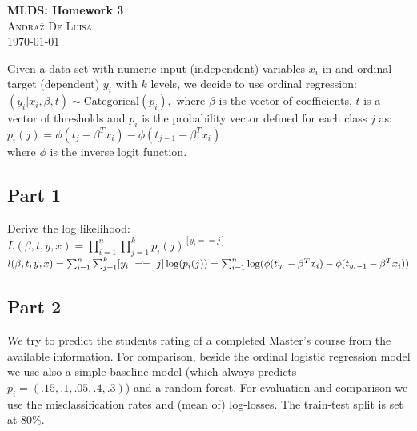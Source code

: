 \documentclass[twocolumn, 8pt]{article}
\begin{document}
\begin{center}

\Large{\textbf{MLDS: Homework 3}} \\
\textsc{\large{Andraž De Luisa}} \\
\vspace{6pt}
\small{\today}

\end{center}

Given a data set with numeric input (independent) variables $x_i$  in and ordinal target (dependent) $y_i$ with $k$ levels, we decide to use ordinal regression: $(y_i|x_i,\beta, t) \sim \text{Categorical}(p_i),$ where $\beta$ is the vector of coefficients, $t$ is a vector of thresholds and $p_i$ is the probability vector defined for each class $j$ as: \\

\begin{math}
    p_i(j) = \phi (t_j - \beta^T x_i) - \phi (t_{j-1} - \beta^T x_i),
\end{math} \\

where $\phi$ is the inverse logit function.

\subsection*{Part 1} Derive the log likelihood: \\

\begin{math} 
    L(\beta, t, y, x) = \prod_{i=1}^n \prod_{j=1}^k p_i(j)^{[y_i == j]}
\end{math} \\

\begin{math}
    l(\beta, t, y, x) = \sum_{i=1}^n \sum_{j=1}^k [y_i~==~j] \log(p_i(j)) \\ = \sum_{i=1}^n \log(\phi(t_{y_i} - \beta^T x_i) - \phi(t_{y_i - 1} - \beta^T x_i))
\end{math}

\subsection*{Part 2} 

We try to predict the students rating of a completed Master's course from the available information. For comparison, beside the ordinal logistic regression model we use also a simple baseline model (which always predicts $p_i = (.15, .1, .05, .4, .3)$) and a random forest. For evaluation and comparison we use the misclassification rates and (mean of) log-losses. The train-test split is set at $80\%$.
\end{document}
